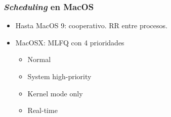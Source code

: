 \documentclass[letter]{beamer}
\begin{document}
\begin{frame}
  \frametitle{{\em Scheduling} en MacOS}

  \begin{itemize}
    \item Hasta MacOS 9: cooperativo. RR entre procesos.
    \item MacOSX: MLFQ con 4 prioridades
      \begin{itemize}
        \item Normal
        \item System high-priority
        \item Kernel mode only
        \item Real-time
      \end{itemize}
  \end{itemize}

\end{frame}
\end{document}
